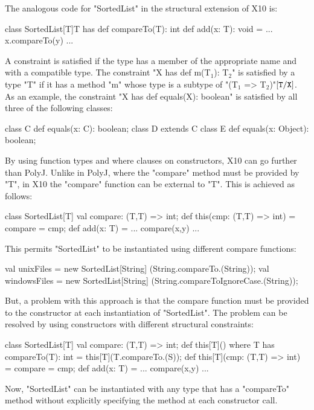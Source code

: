 \documentclass[preprint,nocopyrightspace,9pt]{sigplanconf}
\begin{document}
The analogous code for \xcd"SortedList" in the structural
extension of X10 is:
\begin{xten}
class SortedList[T]{T has def compareTo(T): int} {
    def add(x: T): void = { ... x.compareTo(y) ... }
}
\end{xten}

A constraint is satisfied if the type has a member of the appropriate name
and with a compatible type.
The constraint \xcdmath"X has def m(T$_1$): T$_2$"
is satisfied by a type \xcd"T" if it has a method \xcd"m"
whose type is a subtype of \xcdmath"(T$_1$ => T$_2$)"$[{\tt T}/{\tt X}]$.
As an example,
the constraint \xcd"X has def equals(X): boolean"
is satisfied by all three of the following classes:
\begin{xten}
class C { def equals(x: C): boolean; }
class D extends C { }
class E { def equals(x: Object): boolean; }
\end{xten}

By using function types and where clauses on constructors,
X10 can go further than PolyJ.
Unlike in PolyJ, where the \xcd"compare" method must be provided by \xcd"T",
in X10 the \xcd"compare" function can be external to \xcd"T".
This is achieved as follows:
\begin{xten}
class SortedList[T] {
    val compare: (T,T) => int;
    def this(cmp: (T,T) => int) = { compare = cmp; }
    def add(x: T) = { ... compare(x,y) ... }
}
\end{xten}

This permits
\xcd"SortedList" to be instantiated using different compare functions:
\begin{xten}
val unixFiles    = new SortedList[String]
                        (String.compareTo.(String));
val windowsFiles = new SortedList[String]
                        (String.compareToIgnoreCase.(String));
\end{xten}

But, a problem with this approach is that the compare function must be
provided to the constructor at each instantiation of \xcd"SortedList".
The problem can be resolved by using constructors with different
structural constraints:
\begin{xten}
class SortedList[T] {
    val compare: (T,T) => int;
    def this[T]() where T has compareTo(T): int = {
        this[T](T.compareTo.(S));
    }
    def this[T](cmp: (T,T) => int) = { compare = cmp; }
    def add(x: T) = { ... compare(x,y) ... }
}
\end{xten}
Now, \xcd"SortedList" can be instantiated with any type that has
a \xcd"compareTo"
method without explicitly specifying the method at each constructor call.
\end{document}
